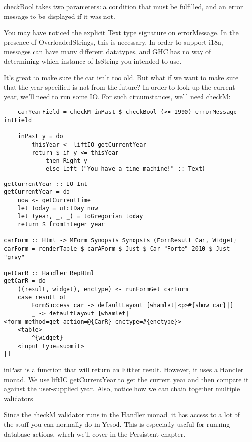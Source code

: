 checkBool takes two parameters: a condition that must be fulfilled, and an error message to be displayed if it was not.

You may have noticed the explicit Text type signature on errorMessage. In the presence of OverloadedStrings, this is necessary. In order to support i18n, messages can have many different datatypes, and GHC has no way of determining which instance of IsString you intended to use.

It's great to make sure the car isn't too old. But what if we want to make sure that the year specified is not from the future? In order to look up the current year, we'll need to run some IO. For such circumstances, we'll need checkM:

\begin{lstlisting}
    carYearField = checkM inPast $ checkBool (>= 1990) errorMessage intField

    inPast y = do
        thisYear <- liftIO getCurrentYear
        return $ if y <= thisYear
            then Right y
            else Left ("You have a time machine!" :: Text)
\end{lstlisting}

\begin{lstlisting}
getCurrentYear :: IO Int
getCurrentYear = do
    now <- getCurrentTime
    let today = utctDay now
    let (year, _, _) = toGregorian today
    return $ fromInteger year

carForm :: Html -> MForm Synopsis Synopsis (FormResult Car, Widget)
carForm = renderTable $ carAForm $ Just $ Car "Forte" 2010 $ Just "gray"

getCarR :: Handler RepHtml
getCarR = do
    ((result, widget), enctype) <- runFormGet carForm
    case result of
        FormSuccess car -> defaultLayout [whamlet|<p>#{show car}|]
        _ -> defaultLayout [whamlet|
<form method=get action=@{CarR} enctype=#{enctype}>
    <table>
        ^{widget}
    <input type=submit>
|]
\end{lstlisting}

inPast is a function that will return an Either result. However, it uses a Handler monad. We use liftIO getCurrentYear to get the current year and then compare it against the user-supplied year. Also, notice how we can chain together multiple validators.

Since the checkM validator runs in the Handler monad, it has access to a lot of the stuff you can normally do in Yesod. This is especially useful for running database actions, which we'll cover in the Persistent chapter.

